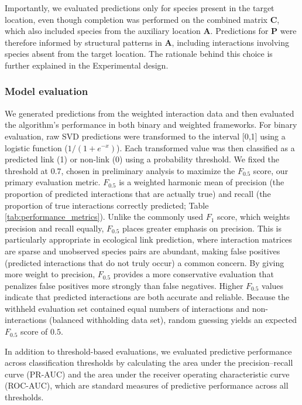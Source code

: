 \documentclass[oneside, a4paper, onecolumn, 11pt]{article}
\newcommand{\revtag}[1]{\textcolor{softcoral}{[#1]}}
\begin{document}
Importantly, we evaluated predictions only for species present in the target location, even though completion was performed on the combined matrix $\mathbf{C}$, which also included species from the auxiliary location $\mathbf{A}$. 
Predictions for $\mathbf{P}$ were therefore informed by structural patterns in $\mathbf{A}$, including interactions involving species absent from the target location. 
The rationale behind this choice is further explained in the Experimental design.


\subsubsection{Model evaluation}
We generated predictions from the weighted interaction data and then evaluated the algorithm's performance in both binary and weighted frameworks. For binary evaluation, raw SVD predictions were transformed to the interval [0,1] using a logistic function ($1/(1+e^{-x})$). Each transformed value was then classified as a predicted link (1) or non-link (0) using a probability threshold. We fixed the threshold at 0.7, chosen in preliminary analysis to maximize the $F_{0.5}$ score, our primary evaluation metric. $F_{0.5}$ is a weighted harmonic mean of precision (the proportion of predicted interactions that are actually true) and recall (the proportion of true interactions correctly predicted; Table \ref{tab:performance_metrics}). Unlike the commonly used $F_1$ score, which weights precision and recall equally, $F_{0.5}$ places greater emphasis on precision. This is particularly appropriate in ecological link prediction, where interaction matrices are sparse and unobserved species pairs are abundant, making false positives (predicted interactions that do not truly occur) a common concern. By giving more weight to precision, $F_{0.5}$ provides a more conservative evaluation that penalizes false positives more strongly than false negatives. Higher $F_{0.5}$ values indicate that predicted interactions are both accurate and reliable. Because the withheld evaluation set contained equal numbers of interactions and non-interactions (balanced withholding data set), random guessing yields an expected $F_{0.5}$ score of $0.5$. %

In addition to threshold-based evaluations, we evaluated predictive performance across classification thresholds by calculating the area under the precision–recall curve (PR-AUC) and the area under the receiver operating characteristic curve (ROC-AUC), which are standard measures of predictive performance across all thresholds.
\end{document}
